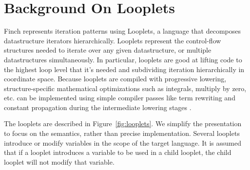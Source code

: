 \section{Background On Looplets}
Finch represents iteration patterns using Looplets, a language that decomposes datastructure iterators hierarchically. 
%
Looplets represent the control-flow structures needed to iterate over any given datastructure, or multiple datastructures simultaneously. 
%
In particular, looplets are good at lifting code to the highest loop level that it's needed and subdividing iteration hierarchically in coordinate space.
%
Because looplets are compiled with progressive lowering, structure-specific mathematical optimizations such as integrals, multiply by zero, etc. can be implemented using simple compiler passes like term rewriting and constant propagation during the intermediate lowering stages \cite{ahrens_looplets_2023}.

The looplets are described in Figure~\ref{fig:looplets}. We simplify the presentation to focus on the semantics, rather than precise implementation.  Several looplets introduce or modify variables in the scope of the target language. It is assumed that if a looplet introduces a variable to be used in a child looplet, the child looplet will not modify that variable.

